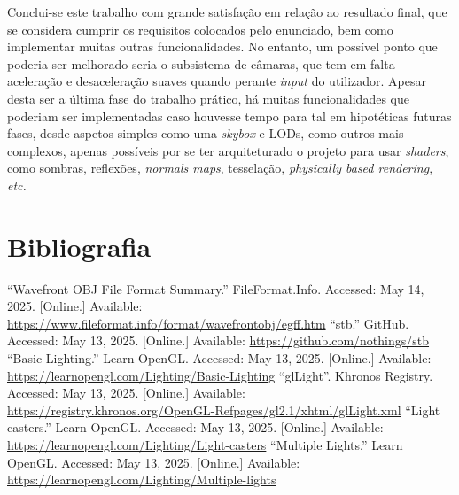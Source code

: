 \documentclass[12pt, a4paper]{article}
\begin{document}
Conclui-se este trabalho com grande satisfação em relação ao resultado final, que se considera
cumprir os requisitos colocados pelo enunciado, bem como implementar muitas outras funcionalidades.
No entanto, um possível ponto que poderia ser melhorado seria o subsistema de câmaras, que tem em
falta aceleração e desaceleração suaves quando perante \emph{input} do utilizador. Apesar desta ser
a última fase do trabalho prático, há muitas funcionalidades que poderiam ser implementadas caso
houvesse tempo para tal em hipotéticas futuras fases, desde aspetos simples como uma \emph{skybox} e
LODs, como outros mais complexos, apenas possíveis por se ter arquiteturado o projeto para usar
\emph{shaders}, como sombras, reflexões, \emph{normals maps}, tesselação, \emph{physically based
rendering}, \emph{etc.}

\begingroup
\section{Bibliografia}
\renewcommand{\section}[2]{}

\begin{thebibliography}{9}
        ``Wavefront OBJ File Format Summary.''{} FileFormat.Info. Accessed: May 14, 2025. [Online.]
        Available: \url{https://www.fileformat.info/format/wavefrontobj/egff.htm}
        ``stb.'' GitHub. Accessed: May 13, 2025. [Online.] Available:
        \url{https://github.com/nothings/stb}
        ``Basic Lighting.'' Learn OpenGL. Accessed: May 13, 2025. [Online.] Available:
        \url{https://learnopengl.com/Lighting/Basic-Lighting}
        ``glLight''. Khronos Registry. Accessed: May 13, 2025. [Online.] Available:
        \url{https://registry.khronos.org/OpenGL-Refpages/gl2.1/xhtml/glLight.xml}
        ``Light casters.'' Learn OpenGL. Accessed: May 13, 2025. [Online.] Available:
        \url{https://learnopengl.com/Lighting/Light-casters}
        ``Multiple Lights.'' Learn OpenGL. Accessed: May 13, 2025. [Online.] Available:
        \url{https://learnopengl.com/Lighting/Multiple-lights}
\end{thebibliography}
\endgroup
\end{document}
